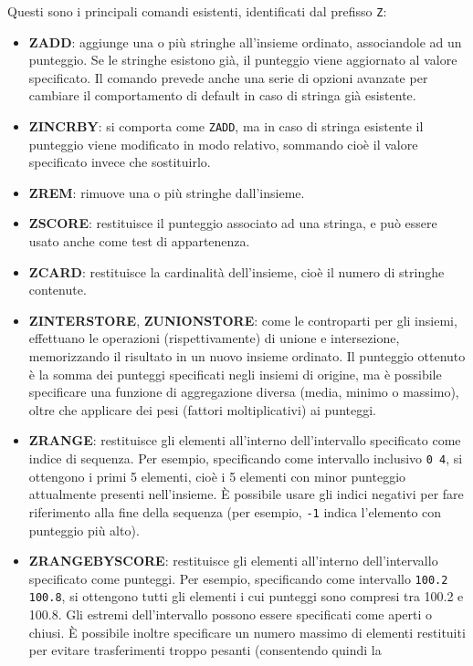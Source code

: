 Questi sono i principali comandi esistenti, identificati dal prefisso \verb|Z|:

\begin{itemize}
	\medskip
	\item \textbf{ZADD}: aggiunge una o più stringhe all'insieme ordinato, associandole ad un
	punteggio. Se le stringhe esistono già, il punteggio viene aggiornato al valore specificato. Il
	comando prevede anche una serie di opzioni avanzate per cambiare il comportamento di default in
	caso di stringa già esistente.
	\item \textbf{ZINCRBY}: si comporta come \verb|ZADD|, ma in caso di stringa esistente il
	punteggio viene modificato in modo relativo, sommando cioè il valore specificato invece che
	sostituirlo.
	\item \textbf{ZREM}: rimuove una o più stringhe dall'insieme.
	\item \textbf{ZSCORE}: restituisce il punteggio associato ad una stringa, e può essere usato
	anche come test di appartenenza.
	\item \textbf{ZCARD}: restituisce la cardinalità dell'insieme, cioè il numero di stringhe
	contenute.
	\item \textbf{ZINTERSTORE}, \textbf{ZUNIONSTORE}: come le controparti per gli insiemi,
	effettuano le operazioni (rispettivamente) di unione e intersezione, memorizzando il risultato
	in un nuovo insieme ordinato. Il punteggio ottenuto è la somma dei punteggi specificati negli
	insiemi di origine, ma è possibile specificare una funzione di aggregazione diversa (media,
	minimo o massimo), oltre che applicare dei pesi (fattori moltiplicativi) ai punteggi.
	\item \textbf{ZRANGE}: restituisce gli elementi all'interno dell'intervallo specificato come
	indice di sequenza. Per esempio, specificando come intervallo inclusivo \verb|0 4|, si
	ottengono i primi 5 elementi, cioè i 5 elementi con minor punteggio attualmente presenti
	nell'insieme. È possibile usare gli indici negativi per fare riferimento alla fine della
	sequenza (per esempio, \verb|-1| indica l'elemento con punteggio più alto).
	\item \textbf{ZRANGEBYSCORE}: restituisce gli elementi all'interno dell'intervallo specificato
	come punteggi. Per esempio, specificando come intervallo \verb|100.2 100.8|, si ottengono tutti
	gli elementi i cui punteggi sono compresi tra 100.2 e 100.8. Gli estremi dell'intervallo
	possono essere specificati come aperti o chiusi. È possibile inoltre specificare un numero
	massimo di elementi restituiti per evitare trasferimenti troppo pesanti (consentendo quindi la

\end{itemize}
